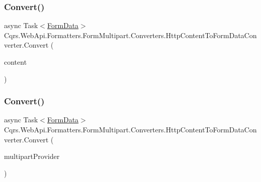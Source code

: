 \subsubsection{\texorpdfstring{Convert()}{Convert()}\hspace{0.1cm}{\footnotesize\ttfamily [1/2]}}
{\footnotesize\ttfamily async Task$<$\hyperlink{classCqrs_1_1WebApi_1_1Formatters_1_1FormMultipart_1_1Infrastructure_1_1FormData}{Form\+Data}$>$ Cqrs.\+Web\+Api.\+Formatters.\+Form\+Multipart.\+Converters.\+Http\+Content\+To\+Form\+Data\+Converter.\+Convert (\begin{DoxyParamCaption}\item[{Http\+Content}]{content }\end{DoxyParamCaption})}

\mbox{\label{classCqrs_1_1WebApi_1_1Formatters_1_1FormMultipart_1_1Converters_1_1HttpContentToFormDataConverter_ae6f522873d47a96df7b4616c7e2d6290_ae6f522873d47a96df7b4616c7e2d6290}} 
\subsubsection{\texorpdfstring{Convert()}{Convert()}\hspace{0.1cm}{\footnotesize\ttfamily [2/2]}}
{\footnotesize\ttfamily async Task$<$\hyperlink{classCqrs_1_1WebApi_1_1Formatters_1_1FormMultipart_1_1Infrastructure_1_1FormData}{Form\+Data}$>$ Cqrs.\+Web\+Api.\+Formatters.\+Form\+Multipart.\+Converters.\+Http\+Content\+To\+Form\+Data\+Converter.\+Convert (\begin{DoxyParamCaption}\item[{Multipart\+Memory\+Stream\+Provider}]{multipart\+Provider }\end{DoxyParamCaption})}

